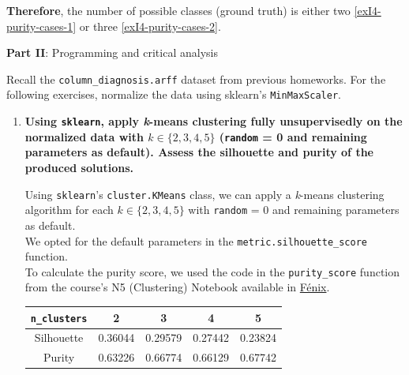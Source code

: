 \documentclass[12pt]{article}
\begin{document}
\begin{enumerate}[leftmargin=\labelsep]
          \textbf{Therefore}, the number of possible classes (ground truth) is either two \eqref{exI4-purity-cases-1} or three \eqref{exI4-purity-cases-2}.
\end{enumerate}

\vskip 0.5cm

\begin{center}
\large{\textbf{Part II}: Programming and critical analysis}\normalsize
\end{center}

\noindent Recall the \texttt{column\_diagnosis.arff} dataset from previous homeworks. For the following exercises,
normalize the data using sklearn's \texttt{MinMaxScaler}.

\begin{enumerate}[leftmargin=\labelsep]
    \item \textbf{Using \texttt{sklearn}, apply \textit{k}-means clustering fully unsupervisedly on the normalized data with
          $k \in \{2,3,4,5\}$ (\textnormal{\texttt{random} = 0} and remaining parameters as default).
          Assess the silhouette and purity of the produced solutions.}

          \vskip 0.3cm
          Using \texttt{sklearn}'s \texttt{cluster.KMeans} class, we can apply a \textit{k}-means clustering algorithm
          for each $k \in \{2,3,4,5\}$ with \texttt{random} = 0 and remaining parameters as default. \\
          We opted for the default parameters in the \texttt{metric.silhouette\_score} function. \\
          To calculate the purity score, we used the code in the \texttt{purity\_score} function from the
          course's N5 (Clustering) Notebook available in
          \href{https://fenix.tecnico.ulisboa.pt/disciplinas/Apre2/2023-2024/1-semestre/notebooks}{Fénix}.

          

          \begin{center}
              \captionsetup{type=table}
              \begin{tabular}{c|cccc}
                  \texttt{n\_clusters} & 2 & 3 & 4 & 5 \\
                  \hline
                  Silhouette           & 0.36044 & 0.29579 & 0.27442 & 0.23824 \\
                  Purity               & 0.63226 & 0.66774 & 0.66129 & 0.67742
              \end{tabular}
              \label{exII1-silhouette-purity}
          \end{center}


\end{enumerate}
\end{document}
